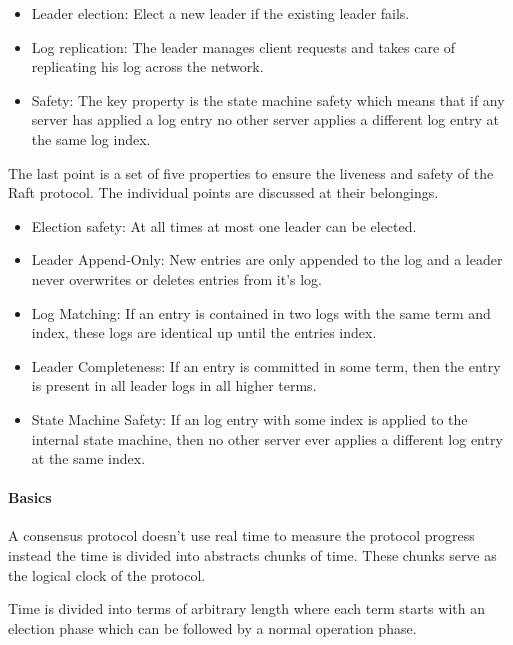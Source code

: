 \begin{itemize}
\item Leader election: Elect a new leader if the existing leader fails.
\item Log replication: The leader manages client requests and takes care
  of replicating his log across the network.
\item Safety:  The key property is the state machine safety which means that
  if any server has applied a log entry no other server applies a
  different log entry at the same log index.
\end{itemize}

The last point is a set of five properties to ensure the liveness and
safety of the Raft protocol. The individual points are discussed at
their belongings.~\cite{ongaro2014search}

\begin{itemize}
\item Election safety: At all times at most one leader can be elected.
\item Leader Append-Only: New entries are only appended to the log and
  a leader never overwrites or deletes entries from it's log.
\item Log Matching: If an entry is contained in two logs with the same
  term and index, these logs are identical up until the entries index.
\item Leader Completeness: If an entry is committed in some term, then the
  entry is present in all leader logs in all higher terms.
\item State Machine Safety: If an log entry with some index is applied to
  the internal state machine, then no other server ever applies a
  different log entry at the same index.
\end{itemize}

\paragraph{Basics}
A consensus protocol doesn't use real time to measure the protocol progress
instead the time is divided into abstracts chunks of time. These chunks
serve as the logical clock of the protocol.~\cite{ongaro2014search}

\begin{defi}
  Time is divided into terms of arbitrary length where each term
  starts with an election phase which can be followed by a normal
  operation phase.
\end{defi}

